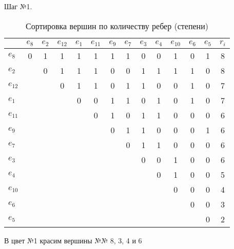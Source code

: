 \documentclass[a4paper,12pt]{article}
\begin{document}
\bigskip
\noindent\begin{minipage}[0cm]{\textwidth}
    Шаг №1.
    \begin{table}[H]
        \caption{Сортировка вершин по количеству ребер (степени)}
        \begin{tabular}{l|*{12}{c}|c}
                     & $e_8$ & $e_2$ & $e_{12}$ & $e_1$ & $e_{11}$ & $e_9$ & $e_7$ & $e_3$ & $e_4$ & $e_{10}$ & $e_6$ & $e_5$ & $r_i$ \\ \hline
            $e_{ 8}$ &     0 &     1 &        1 &     1 &        1 &     1 &     1 &     0 &     0 &        1 &     0 &     1 &     8 \\
            $e_{ 2}$ &       &     0 &        1 &     1 &        1 &     0 &     0 &     1 &     1 &        1 &     1 &     0 &     8 \\
            $e_{12}$ &       &       &        0 &     1 &        1 &     0 &     1 &     1 &     0 &        0 &     1 &     0 &     7 \\
            $e_{ 1}$ &       &       &          &     0 &        0 &     1 &     1 &     0 &     1 &        0 &     1 &     0 &     7 \\
            $e_{11}$ &       &       &          &       &        0 &     1 &     0 &     1 &     1 &        0 &     0 &     0 &     6 \\
            $e_{ 9}$ &       &       &          &       &          &     0 &     1 &     1 &     0 &        0 &     0 &     1 &     6 \\
            $e_{ 7}$ &       &       &          &       &          &       &     0 &     1 &     1 &        0 &     0 &     0 &     6 \\
            $e_{ 3}$ &       &       &          &       &          &       &       &     0 &     0 &        1 &     0 &     0 &     6 \\
            $e_{ 4}$ &       &       &          &       &          &       &       &       &     0 &        1 &     0 &     0 &     5 \\
            $e_{10}$ &       &       &          &       &          &       &       &       &       &        0 &     0 &     0 &     4 \\
            $e_{ 6}$ &       &       &          &       &          &       &       &       &       &          &     0 &     0 &     3 \\
            $e_{ 5}$ &       &       &          &       &          &       &       &       &       &          &       &     0 &     2 \\
        \end{tabular}
    \end{table}
    В цвет №1 красим вершины №№ 8, 3, 4 и 6
\end{minipage}
\end{document}
